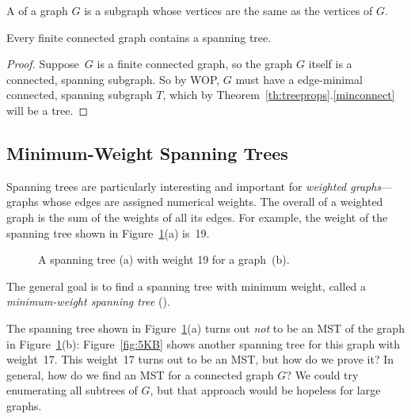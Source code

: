 \begin{definition}
A  of a graph $G$ is a subgraph whose vertices
are the same as the vertices of $G$.
\end{definition}

\begin{theorem}\label{th:spantree}
Every finite connected graph contains a spanning tree.
\end{theorem}

\begin{proof}
Suppose~$G$ is a finite connected graph, so the graph $G$ itself is a
connected, spanning subgraph.  So by WOP, $G$ must have a edge-minimal
connected, spanning subgraph $T$, which by
Theorem~\ref{th:treeprops}.\ref{minconnect} will be a tree.
\end{proof}

\subsection{Minimum-Weight Spanning Trees}\label{MST_subsec}

Spanning trees are particularly interesting and important for
\emph{weighted graphs}---graphs whose edges are assigned numerical
weights.  The overall  of a weighted graph is the sum of
the weights of all its edges.  For example, the weight of the spanning
tree shown in Figure~\ref{fig:5KA}(a) is~19.
\begin{figure}
\qquad
{}

\caption{A spanning tree (a) with weight 19 for a graph~(b).}
\label{fig:5KA}
\end{figure}

The general goal is to find a spanning tree with minimum weight,
called a \emph{minimum-weight spanning tree}
\textup(\textup).

\iffalse
\begin{definition}
A \term{minimum-weight spanning tree} (\textup\term{MST}\textup) of
an edge-weighted graph~$G$ is a spanning tree of~$G$ with the
smallest possible sum of edge weights.
\end{definition}
\fi

The spanning tree shown in Figure~\ref{fig:5KA}(a) turns out
\emph{not} to be an MST of the graph in Figure~\ref{fig:5KA}(b):
Figure~\ref{fig:5KB} shows another spanning tree for this graph with
weight~17.  This weight~17 turns out to be an MST, but how do we prove
it?  In general, how do we find an MST for a connected graph $G$?  We
could try enumerating all subtrees of $G$, but that approach would be
hopeless for large graphs.

